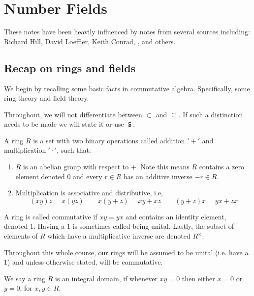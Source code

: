 \maketitle




\chapter{Number Fields}

These notes have been heavily influenced by notes from several sources including: Richard Hill, David Loeffler, Keith Conrad, \cite{marcus},\cite{Samuel} and others.

\section{Recap on rings and fields}
We begin by recalling some basic facts in commutative algebra. Specifically, some ring theory and field theory.	


\begin{rmrk*}
	Throughout, we will not differentiate between $\subset$ and $\subseteq$. If such a distinction needs to be made we will state it or use $\subsetneqq$. 
\end{rmrk*}

\begin{defn}
	A ring $R$ is a set with two binary operations called addition $'+'$ and multiplication $'\cdot'$, such that:
	
	\begin{enumerate}
		\item $R$ is an abelian group with respect to  $+$. Note this means $R$ contains a zero element denoted $0$ and every $r \in R$ has an additive inverse $-r \in R$.
		\item Multiplication is associative and distributive, i.e, \[(xy)z=x(yz) \qquad x(y+z)=xy+xz \qquad (y+z)x=yx+zx\]
	\end{enumerate}
	A ring is called commutative if $xy=yx$ and contains an identity element, denoted $1$. Having a $1$ is sometimes called being unital. Lastly, the subset of elements of $R$ which have a multiplicative inverse are denoted $R^\times$.
	
\end{defn}




\begin{nota}
	Throughout this whole course, our rings will be assumed to be unital (i.e. have a $1$) and unless otherwise stated, will be commutative.
\end{nota}
\begin{defn}
	We say a ring $R$ is an integral domain, if whenever $xy=0$ then either $x=0$ or $y=0$, for $x,y \in R$.
\end{defn}





